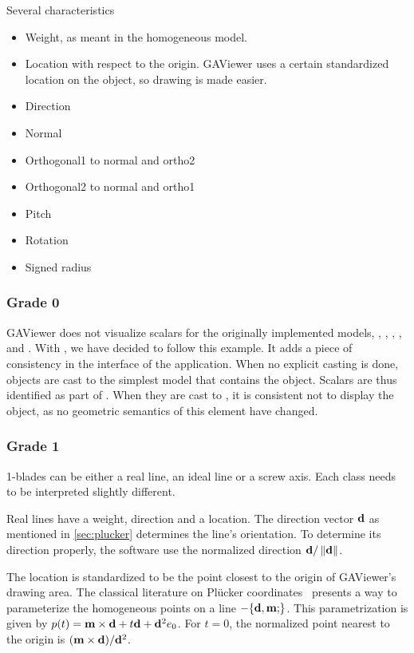 Several characteristics 
\begin{itemize}
  \item Weight, as meant in the homogeneous model.
  \item Location with respect to the origin.  GAViewer uses a certain standardized location on the object, so drawing is made easier.
  \item Direction
  \item Normal
  \item Orthogonal1 to normal and ortho2
  \item Orthogonal2 to normal and ortho1
  \item Pitch
  \item Rotation
  \item Signed radius
\end{itemize}


\subsubsection{Grade 0}
GAViewer does not visualize scalars for the originally implemented models, \ega{}, \pga{}, \cga{}, \cbga{}, and \iga.  With \lga{}, we have decided to follow this example.  It adds a piece of consistency in the interface of the application.  When no explicit casting is done, objects are cast to the simplest model that contains the object.  Scalars are thus identified as part of \ega{}.  When they are cast to \lga{}, it is consistent not to display the object, as no geometric semantics of this element have changed.


\subsubsection{Grade 1}
1-blades can be either a real line, an ideal line or a screw axis.  Each class needs to be interpreted slightly different.

Real lines have a weight, direction and a location.  The direction vector $\mathbf{d}$ as mentioned in \autoref{sec:plucker} determines the line's orientation.  To determine its direction properly, the software use the normalized direction $\mathbf{d} / \left\|\mathbf{d}\right\|$.

The location is standardized to be the point closest to the origin of GAViewer's drawing area.  The classical literature on Pl\"ucker coordinates~\cite{Shoemake} presents a way to parameterize the homogeneous points on a line $-\plucker{\V{d}, \V{m}}$.  This parametrization is given by $p(t) = \mathbf{m} \times \mathbf{d} + t \mathbf{d} + \mathbf{d}^2e_0$.  For $t = 0$, the normalized point nearest to the origin is $(\mathbf{m} \times \mathbf{d}) / \mathbf{d}^2$.

